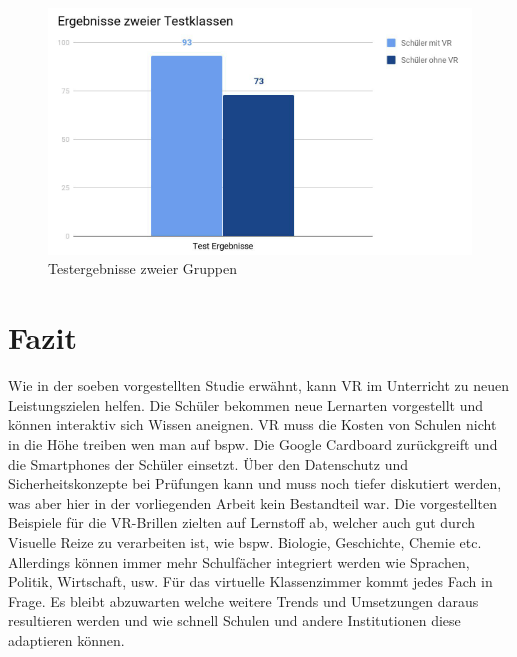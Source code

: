 \begin{figure}[ht]
	\centering
	\includegraphics[width=\textwidth,height=\textheight,keepaspectratio]{images/Testergebnisse zweier Gruppen.png}
	\caption{Testergebnisse zweier Gruppen}
	\label{Testergebnisse zweier Gruppen}
\end{figure}

\section{Fazit}
Wie in der soeben vorgestellten Studie erwähnt, kann VR im Unterricht zu neuen Leistungszielen helfen. Die Schüler bekommen neue Lernarten vorgestellt und können interaktiv sich Wissen aneignen. VR muss die Kosten von Schulen nicht in die Höhe treiben wen man auf bspw. Die Google Cardboard zurückgreift und die Smartphones der Schüler einsetzt. Über den Datenschutz und Sicherheitskonzepte bei Prüfungen kann und muss noch tiefer diskutiert werden, was aber hier in der vorliegenden Arbeit kein Bestandteil war. Die vorgestellten Beispiele für die VR-Brillen zielten auf Lernstoff ab, welcher auch gut durch Visuelle Reize zu verarbeiten ist, wie bspw. Biologie, Geschichte, Chemie etc. Allerdings können immer mehr Schulfächer integriert werden wie Sprachen, Politik, Wirtschaft, usw. Für das virtuelle Klassenzimmer kommt jedes Fach in Frage. 
Es bleibt abzuwarten welche weitere Trends und Umsetzungen daraus resultieren werden und wie schnell Schulen und andere Institutionen diese adaptieren können. 